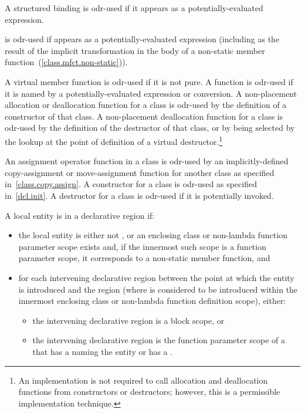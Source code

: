 \pnum
A structured binding is odr-used if it appears as a potentially-evaluated expression.

\pnum
{} is odr-used if  appears as a potentially-evaluated expression
(including as the result of the implicit transformation in the body of a non-static
member function~(\ref{class.mfct.non-static})).

\pnum
A virtual member
function is odr-used if it is not pure.
A function is odr-used if it is named by
a potentially-evaluated expression or conversion.
A non-placement allocation or deallocation
function for a class is odr-used by the definition of a constructor of that
class. A non-placement deallocation function for a class is odr-used by the
definition of the destructor of that class, or by being selected by the
lookup at the point of definition of a virtual
destructor.\footnote{An implementation is not required
to call allocation and
deallocation functions from constructors or destructors; however, this
is a permissible implementation technique.}

\pnum
An assignment operator function in a class is odr-used by an
implicitly-defined
copy-assignment or move-assignment function for another class as specified
in~\ref{class.copy.assign}.
A constructor for a class is odr-used as specified
in~\ref{dcl.init}. A destructor for a class is odr-used if it is potentially
invoked.

\pnum
A local entity
is  in a declarative region if:

\begin{itemize}
\item the local entity is either
not , or
an enclosing class or non-lambda function parameter scope exists and,
if the innermost such scope is a function parameter scope,
it corresponds to a non-static member function, and
\item
for each intervening declarative region
between the point at which the entity is introduced and the region
(where  is considered to be introduced
within the innermost enclosing class or non-lambda function definition scope),
either:
\begin{itemize}
\item the intervening declarative region is a block scope, or
\item the intervening declarative region is the function parameter scope of a 
that has a  naming the entity or has a .
\end{itemize}
\end{itemize}

